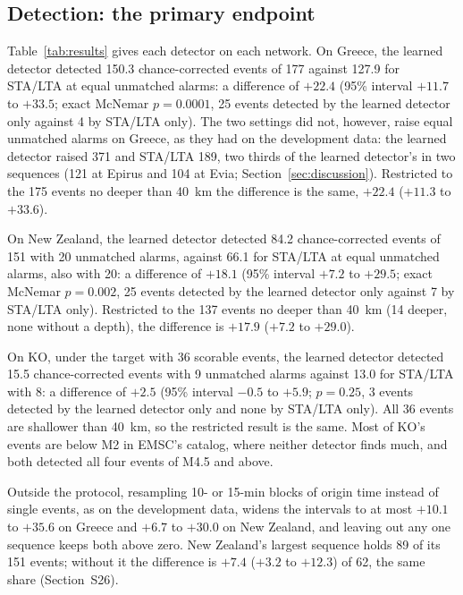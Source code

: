 \documentclass[a4paper,fleqn]{cas-sc}
\newcommand{\stalta}{STA/LTA}
\begin{document}
\subsection{Detection: the primary endpoint}\label{sec:primary}

Table~\ref{tab:results} gives each detector on each network. On Greece, the learned
detector detected 150.3 chance-corrected events of 177 against 127.9 for \stalta{} at
equal unmatched alarms: a difference of $+22.4$ (95\% interval $+11.7$ to $+33.5$;
  exact McNemar $p = 0.0001$, 25 events detected by the learned detector only against 4
by \stalta{} only). The two settings did not, however, raise equal unmatched alarms
on Greece, as they had on the development data: the learned detector raised 371 and
\stalta{} 189, two thirds of the learned detector's in two sequences (121 at Epirus
and 104 at Evia; Section~\ref{sec:discussion}). Restricted to the 175 events no deeper
than 40~km the difference is the same, $+22.4$ ($+11.3$ to $+33.6$).

On New Zealand, the learned detector detected 84.2 chance-corrected events of 151
with 20 unmatched alarms, against 66.1 for \stalta{} at equal unmatched alarms, also
with 20: a difference of $+18.1$ (95\% interval $+7.2$ to $+29.5$; exact McNemar
  $p = 0.002$, 25 events detected by the learned detector only against 7 by \stalta{}
only). Restricted to the 137 events no deeper than 40~km (14 deeper, none without a
depth), the difference is $+17.9$ ($+7.2$ to $+29.0$).

On KO, under the target with 36 scorable events, the learned detector detected 15.5
chance-corrected events with 9 unmatched alarms against 13.0 for \stalta{} with 8: a
difference of $+2.5$ (95\% interval $-0.5$ to $+5.9$; $p = 0.25$, 3 events detected by
the learned detector only and none by \stalta{} only). All 36 events are shallower
than 40~km, so the restricted result is the same. Most of KO's events are below M2 in
EMSC's catalog, where neither detector finds much, and both detected all four events
of M4.5 and above.

Outside the protocol, resampling 10- or 15-min blocks of origin time instead of
single events, as on the development data, widens the intervals to at most $+10.1$ to
$+35.6$ on Greece and $+6.7$ to $+30.0$ on New Zealand, and leaving out any one
sequence keeps both above zero. New Zealand's largest sequence holds 89 of its 151
events; without it the difference is $+7.4$ ($+3.2$ to $+12.3$) of 62, the same share
(Section~S26).
\end{document}
